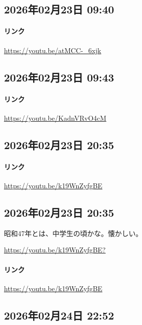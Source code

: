 \subsection*{2026年02月23日 09:40}

\paragraph{リンク}
\url{https://youtu.be/atMCC-_6xjk}

\subsection*{2026年02月23日 09:43}

\paragraph{リンク}
\url{https://youtu.be/KadnVRvO4cM}

\subsection*{2026年02月23日 20:35}

\paragraph{リンク}
\url{https://youtu.be/k19WnZyfgBE}

\subsection*{2026年02月23日 20:35}

昭和47年とは、中学生の頃かな。懐かしい。

\url{https://youtu.be/k19WnZyfgBE?}

\paragraph{リンク}
\url{https://youtu.be/k19WnZyfgBE}

\subsection*{2026年02月24日 22:52}

